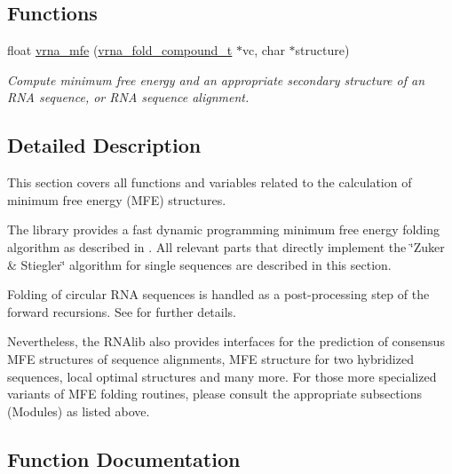 \subsection*{Functions}
\begin{DoxyCompactItemize}
\item 
float \hyperlink{group__mfe__fold_gabd3b147371ccf25c577f88bbbaf159fd}{vrna\+\_\+mfe} (\hyperlink{group__fold__compound_ga1b0cef17fd40466cef5968eaeeff6166}{vrna\+\_\+fold\+\_\+compound\+\_\+t} $\ast$vc, char $\ast$structure)
\begin{DoxyCompactList}\small\item\em Compute minimum free energy and an appropriate secondary structure of an R\+N\+A sequence, or R\+N\+A sequence alignment. \end{DoxyCompactList}\end{DoxyCompactItemize}


\subsection{Detailed Description}
This section covers all functions and variables related to the calculation of minimum free energy (M\+F\+E) structures. 

The library provides a fast dynamic programming minimum free energy folding algorithm as described in \cite{zuker:1981}. All relevant parts that directly implement the \char`\"{}\+Zuker \& Stiegler\char`\"{} algorithm for single sequences are described in this section.

Folding of circular R\+N\+A sequences is handled as a post-\/processing step of the forward recursions. See \cite{hofacker:2006} for further details.

Nevertheless, the R\+N\+Alib also provides interfaces for the prediction of consensus M\+F\+E structures of sequence alignments, M\+F\+E structure for two hybridized sequences, local optimal structures and many more. For those more specialized variants of M\+F\+E folding routines, please consult the appropriate subsections (Modules) as listed above. 

\subsection{Function Documentation}
\hypertarget{group__mfe__fold_gabd3b147371ccf25c577f88bbbaf159fd}{}
